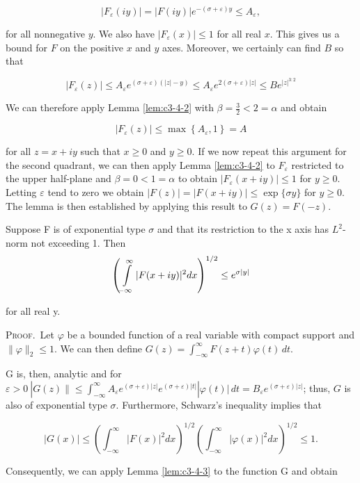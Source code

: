 \[
|F_{\varepsilon}(i y)|=|F(i y)|e^{-(\sigma+\varepsilon)y}\leq A_{\varepsilon},
\]

for all nonnegative $y$. We also have $|F_\varepsilon(x)| \leq 1$ for all real $x$. This gives us a bound for $F$ on the positive $x$ and $y$ axes. Moreover, we certainly can find $B$ so that

\[
\big|F_{\varepsilon}(z)\big|\leq A_{\varepsilon}e^{(\sigma+\varepsilon)(|z|-y)}\leq A_{\varepsilon}e^{2(\sigma+\varepsilon)|z|}\leq B e^{|z|^{3:2}}
\]

We can therefore apply Lemma \ref{lem:c3-4-2} with $\beta = \frac{3}{2} < 2 = \alpha$ and obtain

\[
\left|F_{\varepsilon}(z)\right|\leq\max\left\{A_{\varepsilon},1\right\}=A
\]

for all $z = x + iy$ such that $x \geq 0$ and $y \geq 0$. If we now repeat this argument for the second quadrant, we can then apply Lemma \ref{lem:c3-4-2} to $F_\varepsilon$ restricted to the upper half-plane and $\beta = 0 < 1 = \alpha$ to obtain $|F_\varepsilon(x + iy)| \leq 1$ for $y \geq 0$. Letting $\varepsilon$ tend to zero we obtain $|F(z)| = |F(x + iy)| \leq \exp\{\sigma y\}$ for $y \geq 0$. The lemma is then established by applying this result to $G(z) = F(-z)$.

\begin{lemma}
\label{lem:c3-4-4}
Suppose F is of exponential type $\sigma$ and that its restriction to the x axis has $L^{2}$-norm not exceeding 1. Then
\[
\left(\intop_{-\infty}^{\infty}|F(x+i y)|^{2}d x\right)^{1/2}\leq e^{\sigma|y|}
\]

for all real y.
\end{lemma}

\textsc{Proof.}\ Let $\varphi$ be a bounded function of a real variable with compact support and $\|\varphi\|_2 \leq 1$. We can then define $G(z) = \int_{-\infty}^{\infty} F(z + t)\varphi(t) \, dt$.

G is, then, analytic and for $\varepsilon > 0\ |G(z)\|\leq\int_{-\infty}^{\infty}A_{\varepsilon}e^{(\sigma+\varepsilon)|z|}e^{(\sigma+\varepsilon)|t|}|\varphi(t)|\,dt=B_{\varepsilon}e^{(\sigma+\varepsilon)|z|}$; thus, $G$ is also of exponential type $\sigma$. Furthermore, Schwarz's inequality implies that

\[
|G(x)|\leq\left(\int_{-\infty}^{\infty}|F(x)|^{2}d x\right)^{1/2}\left(\int_{-\infty}^{\infty}|\varphi(x)|^{2}d x\right)^{1/2}\leq1.
\]

Consequently, we can apply Lemma \ref{lem:c3-4-3} to the function G and obtain

